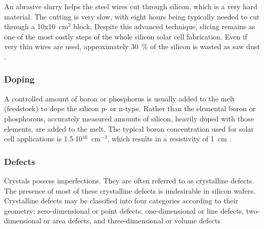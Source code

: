 An abrasive slurry helps the steel wires cut through silicon, which is a very hard material. The cutting is very slow, with eight hours being typically needed to cut through a 10x10~cm$^2$ block. Despite this advanced technique, slicing remains as one of the most costly steps of the whole silicon solar cell fabrication. Even if very thin wires are used, approximately 30~\% of the silicon is wasted as saw dust \cite{solar_cells}.


\subsubsection{Doping}

A controlled amount of boron or phosphorus is usually added to the melt (feedstock) to dope the silicon p- or n-type. Rather than the elemental boron or phosphorous, accurately measured amounts of silicon, heavily doped with those elements, are added to the melt. The typical boron concentration used for solar cell applications is 1.5$\cdot$10$^{16}$~cm$^{-3}$, which results in a resistivity of 1~\ohm cm \cite{solar_cells}.


\subsubsection{Defects}

Crystals possess imperfections. They are often referred to as crystalline defects. The presence of most of these crystalline defects is undesirable in silicon wafers. Crystalline defects may be classified into four categories according to their geometry; zero-dimensional or point defects, one-dimensional or line defects, two-dimensional or area defects, and three-dimensional or volume defects

